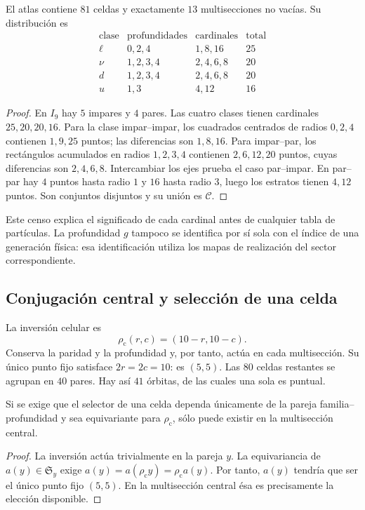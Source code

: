 \begin{proposition}
\label{vi:prop:censo13}
El atlas contiene \(81\) celdas y exactamente \(13\) multisecciones no vacías.
Su distribución es
\[
\begin{array}{c|c|c|r}
\text{clase}&\text{profundidades}&\text{cardinales}&\text{total}\\\hline
\ell&0,2,4&1,8,16&25\\
\nu&1,2,3,4&2,4,6,8&20\\
d&1,2,3,4&2,4,6,8&20\\
u&1,3&4,12&16
\end{array}
\]
\end{proposition}
\begin{proof}
En \(I_9\) hay \(5\) impares y \(4\) pares. Las cuatro clases tienen
cardinales \(25,20,20,16\). Para la clase impar--impar, los cuadrados
centrados de radios \(0,2,4\) contienen \(1,9,25\) puntos; las
diferencias son \(1,8,16\). Para impar--par, los rectángulos acumulados
en radios \(1,2,3,4\) contienen \(2,6,12,20\) puntos, cuyas
diferencias son \(2,4,6,8\). Intercambiar los ejes prueba el caso
par--impar. En par--par hay \(4\) puntos hasta radio \(1\) y \(16\)
hasta radio \(3\), luego los estratos tienen \(4,12\) puntos.
Son conjuntos disjuntos y su unión es \(\mathcal C\).
\end{proof}

Este censo explica el significado de cada cardinal antes de cualquier tabla
de partículas. La profundidad \(g\) tampoco se identifica por sí sola con
el índice de una generación física: esa identificación utiliza los mapas
de realización del sector correspondiente.

\subsection{Conjugación central y selección de una celda}

La inversión celular es
\[
 \rho_{\mathrm c}(r,c)=(10-r,10-c).
\]
Conserva la paridad y la profundidad y, por tanto, actúa en cada
multisección. Su único punto fijo satisface \(2r=2c=10\): es \((5,5)\).
Las \(80\) celdas restantes se agrupan en \(40\) pares. Hay así
\(41\) órbitas, de las cuales una sola es puntual.

\begin{proposition}
Si se exige que el selector de una celda dependa únicamente de la pareja
familia--profundidad y sea equivariante para \(\rho_{\mathrm c}\), sólo
puede existir en la multisección central.
\end{proposition}
\begin{proof}
La inversión actúa trivialmente en la pareja \(y\). La equivariancia de
\(a(y)\in\mathfrak S_y\) exige
\(a(y)=a(\rho_{\mathrm c}y)=\rho_{\mathrm c}a(y)\).
Por tanto, \(a(y)\) tendría que ser el único punto fijo \((5,5)\).
En la multisección central ésa es precisamente la elección disponible.
\end{proof}

